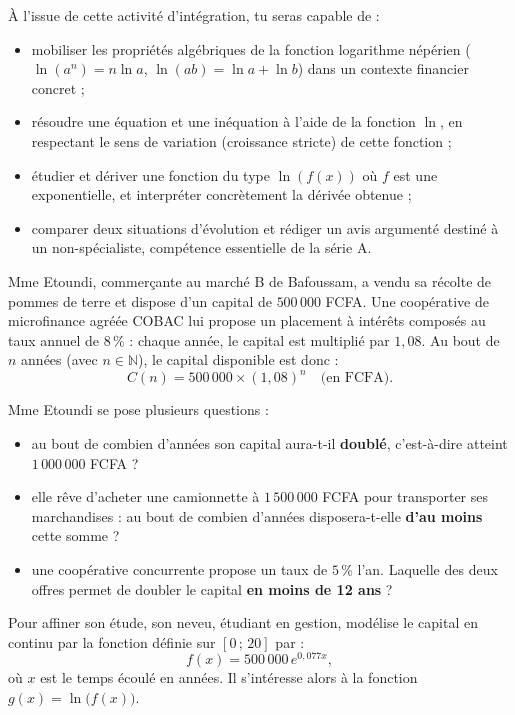 \documentclass[11pt]{article}
\newcommand{\cle}[1]{{\popxbold\color{popdark}#1}}
\newcounter{popsec}
\newcounter{popsub}
\newcommand{\courssub}[1]{%
  \stepcounter{popsub}%
  \par\vspace{9pt}\noindent{\popxbold\fontsize{11.5}{13}\selectfont\color{popink}{\color{poporange}\thepopsec.\thepopsub}\hspace{6pt}#1}\par\nopagebreak\vspace{4pt}
}
\begin{document}
À l'issue de cette activité d'intégration, tu seras capable de :
\begin{itemize}
\item mobiliser les \cle{propriétés algébriques} de la fonction logarithme népérien ($\ln(a^n) = n\ln a$, $\ln(ab) = \ln a + \ln b$) dans un contexte financier concret ;
\item résoudre une \cle{équation} et une \cle{inéquation} à l'aide de la fonction $\ln$, en respectant le sens de variation (croissance stricte) de cette fonction ;
\item étudier et dériver une fonction du type $\ln(f(x))$ où $f$ est une exponentielle, et interpréter concrètement la dérivée obtenue ;
\item comparer deux situations d'évolution et rédiger un \cle{avis argumenté} destiné à un non-spécialiste, compétence essentielle de la série A.
\end{itemize}

\courssub{Situation}

Mme Etoundi, commerçante au marché B de Bafoussam, a vendu sa récolte de pommes de terre et dispose d'un capital de $500\,000$ FCFA. Une coopérative de microfinance agréée COBAC lui propose un placement à \cle{intérêts composés} au taux annuel de $8\,\%$ : chaque année, le capital est multiplié par $1,08$. Au bout de $n$ années (avec $n \in \mathbb{N}$), le capital disponible est donc :
\[ C(n) = 500\,000 \times (1,08)^n \quad \text{(en FCFA)}. \]

Mme Etoundi se pose plusieurs questions :
\begin{itemize}
\item au bout de combien d'années son capital aura-t-il \textbf{doublé}, c'est-à-dire atteint $1\,000\,000$ FCFA ?
\item elle rêve d'acheter une camionnette à $1\,500\,000$ FCFA pour transporter ses marchandises : au bout de combien d'années disposera-t-elle \textbf{d'au moins} cette somme ?
\item une coopérative concurrente propose un taux de $5\,\%$ l'an. Laquelle des deux offres permet de doubler le capital \textbf{en moins de 12 ans} ?
\end{itemize}

Pour affiner son étude, son neveu, étudiant en gestion, modélise le capital en \cle{continu} par la fonction définie sur $[0\,;\,20]$ par :
\[ f(x) = 500\,000\, e^{0,077x}, \]
où $x$ est le temps écoulé en années. Il s'intéresse alors à la fonction $g(x) = \ln\big(f(x)\big)$.
\end{document}
